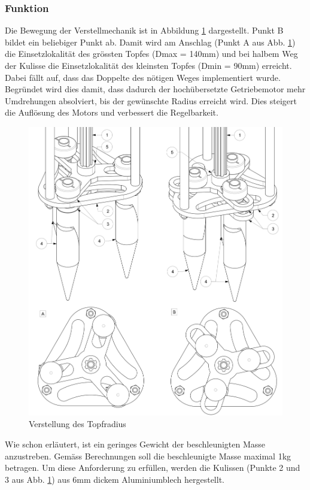 \subsubsection{Funktion}
Die Bewegung der Verstellmechanik ist in Abbildung \ref{fig:motion_vm} dargestellt. Punkt B bildet ein beliebiger Punkt ab. Damit wird am Anschlag (Punkt A aus Abb. \ref{fig:motion_vm}) die Einsetzlokalität des grössten Topfes (Dmax = 140mm) und bei halbem Weg der Kulisse die Einsetzlokalität des kleinsten Topfes (Dmin = 90mm) erreicht. Dabei fällt auf, dass das Doppelte des nötigen Weges implementiert wurde. Begründet wird dies damit, dass dadurch der hochübersetzte Getriebemotor mehr Umdrehungen absolviert, bis der gewünschte Radius erreicht wird. Dies steigert die Auflösung des Motors und verbessert die Regelbarkeit.
	\begin{figure}[H]
	\includegraphics[draft=false,scale=0.53]{Illustrationen/6-Umsetzung/motion_vm.jpg}
	\caption{Verstellung des Topfradius}
	\label{fig:motion_vm}
	\end{figure}

Wie schon erläutert, ist ein geringes Gewicht der beschleunigten Masse anzustreben. Gemäss Berechnungen soll die beschleunigte Masse maximal 1kg betragen. Um diese Anforderung zu erfüllen, werden die Kulissen (Punkte 2 und 3 aus Abb. \ref{fig:motion_vm}) aus 6mm dickem Aluminiumblech hergestellt.

